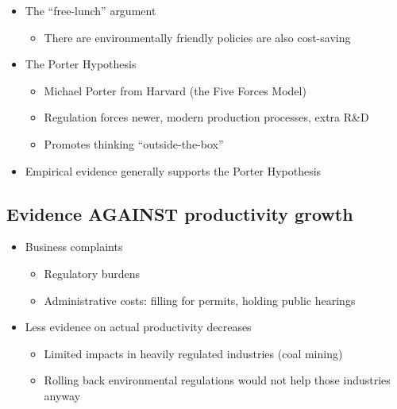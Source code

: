 \documentclass[
]{article}
\providecommand{\tightlist}{%
  \setlength{\itemsep}{0pt}\setlength{\parskip}{0pt}}
\begin{document}
\begin{itemize}
\tightlist
\item
  The ``free-lunch'' argument

  \begin{itemize}
  \tightlist
  \item
    There are environmentally friendly policies are also cost-saving
  \end{itemize}
\item
  The Porter Hypothesis

  \begin{itemize}
  \tightlist
  \item
    Michael Porter from Harvard (the Five Forces Model)
  \item
    Regulation forces newer, modern production processes, extra R\&D
  \item
    Promotes thinking ``outside-the-box''
  \end{itemize}
\item
  Empirical evidence generally supports the Porter Hypothesis
\end{itemize}

\hypertarget{evidence-against-productivity-growth}{%
\subsection{Evidence AGAINST productivity
growth}\label{evidence-against-productivity-growth}}

\begin{itemize}
\tightlist
\item
  Business complaints

  \begin{itemize}
  \tightlist
  \item
    Regulatory burdens
  \item
    Administrative costs: filling for permits, holding public hearings
  \end{itemize}
\item
  Less evidence on actual productivity decreases

  \begin{itemize}
  \tightlist
  \item
    Limited impacts in heavily regulated industries (coal mining)
  \item
    Rolling back environmental regulations would not help those
    industries anyway
  \end{itemize}
\end{itemize}
\end{document}
